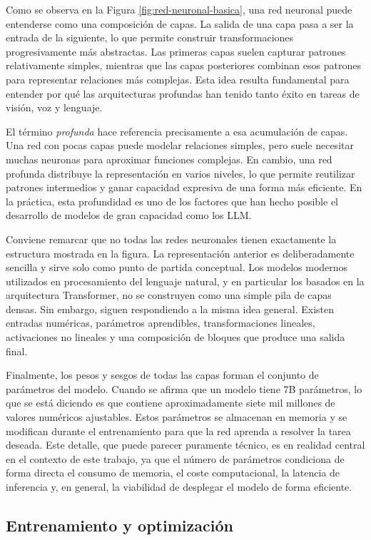 Como se observa en la Figura \ref{fig:red-neuronal-basica}, una red neuronal puede entenderse como una composición de capas. La salida de una capa pasa a ser la entrada de la siguiente, lo que permite construir transformaciones progresivamente más abstractas. Las primeras capas suelen capturar patrones relativamente simples, mientras que las capas posteriores combinan esos patrones para representar relaciones más complejas. Esta idea resulta fundamental para entender por qué las arquitecturas profundas han tenido tanto éxito en tareas de visión, voz y lenguaje.

El término \textit{profunda} hace referencia precisamente a esa acumulación de capas. Una red con pocas capas puede modelar relaciones simples, pero suele necesitar muchas neuronas para aproximar funciones complejas. En cambio, una red profunda distribuye la representación en varios niveles, lo que permite reutilizar patrones intermedios y ganar capacidad expresiva de una forma más eficiente. En la práctica, esta profundidad es uno de los factores que han hecho posible el desarrollo de modelos de gran capacidad como los LLM.

Conviene remarcar que no todas las redes neuronales tienen exactamente la estructura mostrada en la figura. La representación anterior es deliberadamente sencilla y sirve solo como punto de partida conceptual. Los modelos modernos utilizados en procesamiento del lenguaje natural, y en particular los basados en la arquitectura Transformer, no se construyen como una simple pila de capas densas. Sin embargo, siguen respondiendo a la misma idea general. Existen entradas numéricas, parámetros aprendibles, transformaciones lineales, activaciones no lineales y una composición de bloques que produce una salida final.

Finalmente, los pesos y sesgos de todas las capas forman el conjunto de parámetros del modelo. Cuando se afirma que un modelo tiene 7B parámetros, lo que se está diciendo es que contiene aproximadamente siete mil millones de valores numéricos ajustables. Estos parámetros se almacenan en memoria y se modifican durante el entrenamiento para que la red aprenda a resolver la tarea deseada. Este detalle, que puede parecer puramente técnico, es en realidad central en el contexto de este trabajo, ya que el número de parámetros condiciona de forma directa el consumo de memoria, el coste computacional, la latencia de inferencia y, en general, la viabilidad de desplegar el modelo de forma eficiente.
\subsection{Entrenamiento y optimización}

